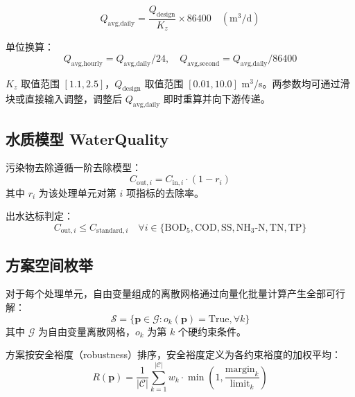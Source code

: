 \documentclass[12pt,a4paper]{ctexart}
\begin{document}
\begin{equation}
Q_{\text{avg,daily}} = \frac{Q_{\text{design}}}{K_z} \times 86400 \quad (\text{m}^3/\text{d})
\end{equation}

单位换算：
\begin{equation}
Q_{\text{avg,hourly}} = Q_{\text{avg,daily}} / 24, \quad
Q_{\text{avg,second}} = Q_{\text{avg,daily}} / 86400
\end{equation}

$K_z$ 取值范围 $[1.1, 2.5]$，$Q_{\text{design}}$ 取值范围 $[0.01, 10.0]$ m$^3$/s。两参数均可通过滑块或直接输入调整，调整后 $Q_{\text{avg,daily}}$ 即时重算并向下游传递。

\subsection{水质模型 WaterQuality}
污染物去除遵循一阶去除模型：
\begin{equation}
C_{\text{out},i} = C_{\text{in},i} \cdot (1 - r_i)
\end{equation}
其中 $r_i$ 为该处理单元对第 $i$ 项指标的去除率。

出水达标判定：
\begin{equation}
C_{\text{out},i} \le C_{\text{standard},i} \quad \forall i \in \{\text{BOD}_5, \text{COD}, \text{SS}, \text{NH}_3\text{-N}, \text{TN}, \text{TP}\}
\end{equation}

\subsection{方案空间枚举}
对于每个处理单元，自由变量组成的离散网格通过向量化批量计算产生全部可行解：
\begin{equation}
\mathcal{S} = \{\mathbf{p} \in \mathcal{G} : o_k(\mathbf{p}) = \text{True}, \forall k\}
\end{equation}
其中 $\mathcal{G}$ 为自由变量离散网格，$o_k$ 为第 $k$ 个硬约束条件。

方案按安全裕度（robustness）排序，安全裕度定义为各约束裕度的加权平均：
\begin{equation}
R(\mathbf{p}) = \frac{1}{|\mathcal{C}|} \sum_{k=1}^{|\mathcal{C}|} w_k \cdot \min\left(1, \frac{\text{margin}_k}{\text{limit}_k}\right)
\end{equation}
\end{document}
